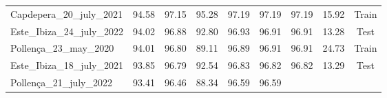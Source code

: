 \begin{table}[H]
{\begin{tabular}{lcccccccc}
            \\
            Capdepera\_20\_july\_2021              & 94.58
                                                   & 97.15
                                                   & 95.28
                                                   & 97.19
                                                   & 97.19
                                                   & 97.19
                                                   & 15.92
                                                   & {\color[HTML]{66c2a5}
                    Train}
            \\
            Este\_Ibiza\_24\_july\_2022            & 94.02
                                                   & 96.88
                                                   & 92.80
                                                   & 96.93
                                                   & 96.91
                                                   & 96.91
                                                   & 13.28
                                                   & {\color[HTML]{fc8d62}
                    Test}
            \\
            Pollença\_23\_may\_2020                & 94.01
                                                   & 96.80
                                                   & 89.11
                                                   & 96.89
                                                   & 96.91
                                                   & 96.91
                                                   & 24.73
                                                   & {\color[HTML]{66c2a5}
                    Train}
            \\
            Este\_Ibiza\_18\_july\_2021            & 93.85
                                                   & 96.79
                                                   & 92.54
                                                   & 96.83
                                                   & 96.82
                                                   & 96.82
                                                   & 13.29
                                                   & {\color[HTML]{fc8d62}
                    Test}
            \\
            Pollença\_21\_july\_2022               & 93.41
                                                   & 96.46
                                                   & 88.34
                                                   & 96.59
                                                   & 96.59

\end{tabular}}
\end{table}
